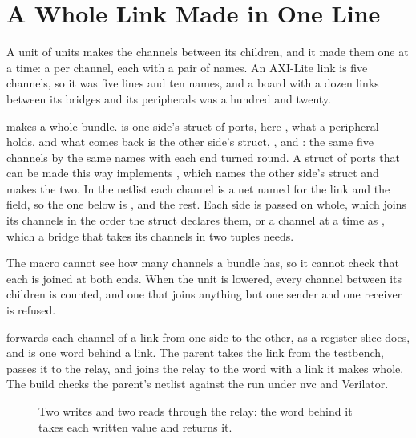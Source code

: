 \section{A Whole Link Made in One Line}
\label{sec:x-link}

A unit of units makes the channels between its children, and it made
them one at a time: a  per channel, each with a
pair of names. An AXI-Lite link is five channels, so it was five
lines and ten names, and a board with a dozen links between its
bridges and its peripherals was a hundred and twenty.

 makes a whole bundle.  is one side's
struct of ports, here , what a peripheral holds, and
what comes back is the other side's struct, , and
: the same five channels by the same names with each end
turned round. A struct of ports that can be made this way implements
, which names the other side's struct and makes the two.
In the netlist each channel is a net named for the link and the
field, so the one below is ,  and the
rest. Each side is passed on whole, which joins its channels in the
order the struct declares them, or a channel at a time as
, which a bridge that takes its channels in two tuples
needs.

The macro cannot see how many channels a bundle has, so it cannot
check that each is joined at both ends. When the unit is lowered,
every channel between its children is counted, and one that joins
anything but one sender and one receiver is refused.

 forwards each channel of a link from one side to the
other, as a register slice does, and  is one word behind a
link. The parent takes the link from the testbench, passes it to the
relay, and joins the relay to the word with a link it makes whole.
The build checks the parent's netlist against the run under nvc and
Verilator.

\begin{figure}[htbp]
\centering

\caption{Two writes and two reads through the relay: the word behind
it takes each written value and returns it.}
\label{fig:x-link}
\end{figure}





